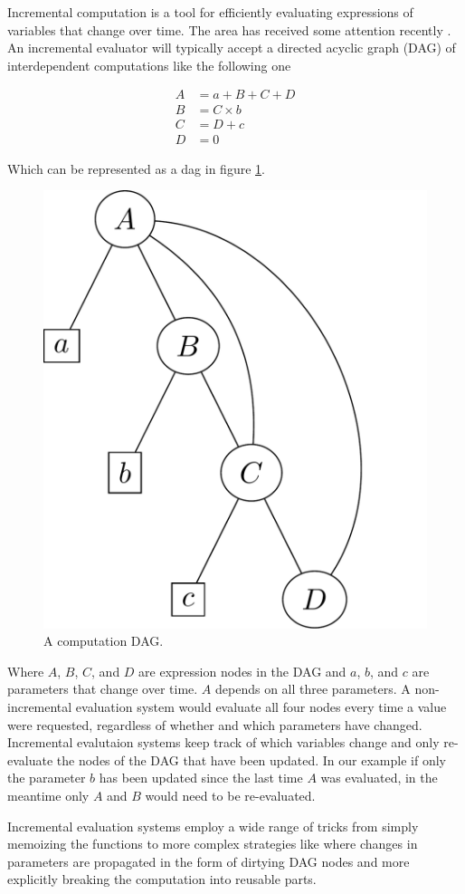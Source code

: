 Incremental computation is a tool for efficiently evaluating
expressions of variables that change over time. The area has received
some attention recently
\cite{bhatotiaIncoopMapReduceIncremental2011,hammerAdaptonComposableDemanddriven2014a}. An
incremental evaluator will typically accept a directed acyclic graph
(DAG) of interdependent computations like the following one

\begin{align*}
A &= a + B + C + D  \\
B &= C \times b \\
C & = D + c \\
D &= 0
\end{align*}

Which can be represented as a dag in figure
\ref{fig:example_antisthenis_dag}.

\begin{figure}[H]
\centering
\includegraphics[width=.5\textwidth]{./imgs/example_antisthenis_dag.pdf}
\caption{\label{fig:example_antisthenis_dag}A computation DAG.}
\end{figure}

Where \(A\), \(B\), \(C\), and \(D\) are expression nodes in the DAG
and \(a\), \(b\), and \(c\) are parameters that change over
time. \(A\) depends on all three parameters. A non-incremental
evaluation system would evaluate all four nodes every time a value
were requested, regardless of whether and which parameters have
changed. Incremental evalutaion systems keep track of which variables
change and only re-evaluate the nodes of the DAG that have been
updated. In our example if only the parameter \(b\) has been updated
since the last time \(A\) was evaluated, in the meantime only \(A\)
and \(B\) would need to be re-evaluated.

Incremental evaluation systems employ a wide range of tricks from
simply memoizing the functions
\cite{pughIncrementalComputationFunction1989} to more complex
strategies like \cite{hammerAdaptonComposableDemanddriven2014a} where
changes in parameters are propagated in the form of dirtying DAG nodes
and more explicitly breaking the computation into reusable parts.

